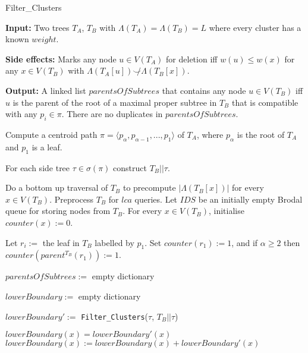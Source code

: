 \documentclass{article}
\newcommand{\compatible}{\smile}
\newcommand{\leafset}{\Lambda}
\begin{document}
    \begin{algorithm}
        \caption{Filter\_Clusters}
        \label{alg:filterclusters}

        \begin{algorithmic}[1]
            \State \textbf{Input:} Two trees $T_A$, $T_B$ with $\leafset(T_A) = \leafset(T_B) = L$ where every cluster has a known $weight$.

            \State \textbf{Side effects:} Marks any node $u \in V(T_A)$ for deletion iff $w(u) \leq w(x)$ for any $x \in V(T_B)$ with $\leafset(T_A[u]) \not\compatible \leafset(T_B[x])$.

            \State \textbf{Output:} A linked list $parentsOfSubtrees$ that contains any node $u \in V(T_B)$ iff $u$ is the parent of the root of a maximal proper subtree in $T_B$ that is compatible with any $p_i \in \pi$. There are no duplicates in $parentsOfSubtrees$.

            \State Compute a centroid path $\pi = \langle p_{\alpha}, p_{\alpha - 1}, ..., p_1 \rangle$ of $T_A$, where $p_{\alpha}$ is the root of $T_A$ and $p_1$ is a leaf.

            \State For each side tree $\tau \in \sigma(\pi)$ construct $T_B||\tau$.

            \State Do a bottom up traversal of $T_B$ to precompute $|\leafset(T_B[x])|$ for every $x \in V(T_B)$. Preprocess $T_B$ for $lca$ queries. Let $IDS$ be an initially empty Brodal queue for storing nodes from $T_B$. For every $x \in V(T_B)$, initialise $counter(x) := 0$.

            \State Let $r_i :=$ the leaf in $T_B$ labelled by $p_1$.\newline
            Set $counter(r_1) := 1$, and if $\alpha \geq 2$ then $counter(parent^{T_B}(r_1)) := 1$.

            \State $parentsOfSubtrees :=$ empty dictionary

                \State $lowerBoundary :=$ empty dictionary

                    \State $lowerBoundary' :=$ \texttt{Filter\_Clusters}($\tau$, $T_B||\tau$)

                            \State $lowerBoundary(x) = lowerBoundary'(x)$
                        \Else
                            \State $lowerBoundary(x) := lowerBoundary(x) + lowerBoundary'(x)$
                        \EndIf
                    \EndFor
                \EndFor


\end{algorithmic}
\end{algorithm}
\end{document}
